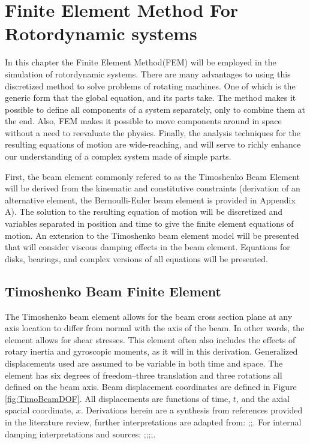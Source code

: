 \chapter{Finite Element Method For Rotordynamic systems}
In this chapter the Finite Element Method(FEM) will be employed in the simulation of rotordynamic systems. There are many advantages to using this discretized method to solve problems of rotating machines. One of which is the generic form that the global equation, and its parts take. The method makes it possible to define all components of a system separately, only to combine them at the end. Also, FEM makes it possible to move components around in space without a need to reevaluate the physics. Finally, the analysis techniques for the resulting equations of motion are wide-reaching, and will serve to richly enhance our understanding of a complex system made of simple parts.\par 
First, the beam element commonly refered to as the Timoshenko Beam Element will be derived from the kinematic and constitutive constraints (derivation of an alternative element, the Bernoulli-Euler beam element is provided in Appendix A). The solution to the resulting equation of motion will be discretized and variables separated in position and time to give the finite element equations of motion. An extension to the Timoshenko beam element model will be presented that will consider viscous damping effects in the beam element. Equations for disks, bearings, and complex versions of all equations will be presented.
\section{Timoshenko Beam Finite Element} \label{Timoshenko Beam Finite Element}
The Timoshenko beam element allows for the beam cross section plane at any axis location to differ from normal with the axis of the beam. In other words, the element allows for shear stresses. This element often also includes the effects of rotary inertia and gyroscopic moments, as it will in this derivation. Generalized displacements used are assumed to be variable in both time and space. The element has six degrees of freedom--three translation and three rotations all defined on the beam axis. Beam displacement coordinates are defined in Figure \ref{fig:TimoBeamDOF}. All displacements are functions of time, $ t $, and the axial spacial coordinate, $ x $. Derivations herein are a synthesis from references provided in the literature review, further interpretations are adapted from: \cite{andersen2008elastic};\cite{gmur1991shaft};\cite{kirchgassner2016finite}. For internal damping interpretations and sources: \cite{ertas2007influence};\cite{kandil2005rotor};\cite{genta2004persistent};\cite{forrai1996stability};\cite{wettergren1996dynamic}.
